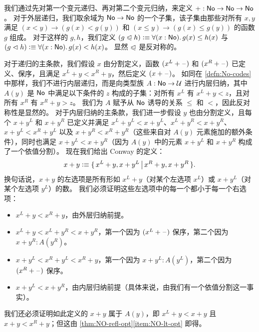 \begin{eg}\label{eg:surreal-addition}
%
我们通过先对第一个变元递归、再对第二个变元归纳，来定义 $\mathord+:\mathsf{No}\to\mathsf{No}\to\mathsf{No}$。
对于外层递归，我们取余域为 $\mathsf{No}\to\mathsf{No}$ 的一个子集，该子集由那些对所有 $x,y$ 满足 $(x<y) \to (g(x)<g(y))$ 和 $(x\le y) \to (g(x)\le g(y))$ 的函数 $g$ 组成。
对于这样的 $g,h$，我们定义 $(g\ble h)\defeq \fall{x:\NO} g(x)\le h(x)$ 与 $(g\blt h)\defeq \fall{x:\NO} g(x)< h(x)$。
显然 $\trianglelefteqslant$ 是反对称的。

对于递归的主条款，我们假设 $x$ 由分割定义，函数 $(x^L+\mathord{\hspace{1pt}\text{--}\hspace{1pt}})$ 和 $(x^R+\mathord{\hspace{1pt}\text{--}\hspace{1pt}})$ 已定义、保序，且满足 $x^L+y<x^R+y$，然后定义 $(x+\mathord{\hspace{1pt}\text{--}\hspace{1pt}})$。
如同在 \cref{defn:No-codes} 中那样，我们不进行内层递归，而是向类型族 $A:\mathsf{No}\to\mathcal{U}$ 进行内层归纳，其中 $A(y)$ 是 $\mathsf{No}$ 中满足以下条件的 $z$ 构成的子集：对所有 $x^L$ 有 $x^L + y < z$，且对所有 $x^R$ 有 $x^R + y > z$。
我们为 $A$ 赋予从 $\mathsf{No}$ 诱导的关系 $\le$ 和 $<$，因此反对称性是显然的。
对于内层归纳的主条款，我们进一步假设 $y$ 也由分割定义，且每个 $x+y^L$ 和 $x+y^R$ 已定义并满足 $x^L+y^L < x+y^L$、$x^L+y^R < x+y^R$、$x+y^L < x^R + y^L$ 以及 $x+y^R < x^R+y^R$（这些来自对 $A(y)$ 元素施加的额外条件），同时也满足 $x+y^L < x+y^R$（因为 $A(y)$ 中的元素 $x+y^L$ 和 $x+y^R$ 构成了一个依值分割）。
现在我们给出 Conway 的定义：
\[ x+y \vcentcolon\equiv \{\,x^L+y, x+y^L\,\big|\,x^R+y,x+y^R\,\}. \]
换句话说，$x+y$ 的左选项是所有形如 $x^L+y$（对某个左选项 $x^L$）或 $x+y^L$（对某个左选项 $y^L$）的数。
我们必须证明这些左选项中的每一个都小于每一个右选项：
\begin{itemize}
\item $x^L+y < x^R+y$，由外层归纳前提。
\item $x^L+y < x^L + y^R < x + y^R$，第一个因为 $(x^L+\mathord{\hspace{1pt}\text{--}\hspace{1pt}})$ 保序，第二个因为 $x+y^R : A(y^R)$。
\item $x+y^L < x^R+ y^L < x^R + y$，第一个因为 $x+y^L : A(y^L)$，第二个因为 $(x^R+\mathord{\hspace{1pt}\text{--}\hspace{1pt}})$ 保序。
\item $x+y^L < x+y^R$，由内层归纳前提（具体来说，由我们有一个依值分割这一事实）。
\end{itemize}
我们还必须证明如此定义的 $x+y$ 属于 $A(y)$，即 $x^L + y < x+y$ 且 $x+y < x^R + y$；但这由 \cref{thm:NO-refl-opt}\ref{item:NO-lt-opt} 即得。


\end{eg}
